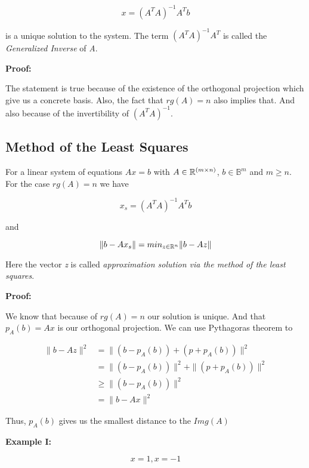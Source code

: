 \[
	x = {(A^T A)}^{-1} A^T b
\]

is a unique solution to the system. The term \({(A^T A)}^{-1}A^T\) is called the 
\emph{Generalized Inverse} of \emph{A}.
\vspace{\baselineskip}

\textbf{Proof:}

The statement is true because of the existence of the orthogonal projection which give us a concrete basis. Also, 
the fact that \(rg(A) = n\) also implies that. And also because of the invertibility of \({(A^T A)}^{-1}\).

\QED

\subsection{Method of the Least Squares}

For a linear system of equations \(Ax=b\) with \(A \in \mathbb{R}^{(m \times n)}\), 
\(b \in \mathbb{B}^m\) and \(m \ge n\). For the case \(rg(A) = n\) we have

\[
	x_s = {(A^T A)}^{-1} A^T b
\]

and 

\[
	\| b - Ax_s \| = min_{z \in \mathbb{R}^n} \| b - Az \| 
\]

Here the vector \emph{z} is called \emph{approximation solution via the method of the least squares}.
\vspace{\baselineskip}

\textbf{Proof:}

We know that because of \(rg(A) = n\) our solution is unique. And that \(p_A(b) = Ax\) is our orthogonal 
projection. We can use Pythagoras theorem to


\begin{align*}
	\| b - Az \|^2 &= \| (b  - p_A (b))  + (p + p_A(b)) \|^2 \\
				&=  \| (b  - p_A (b))\|^2  +\|(p + p_A(b)) \|^2 \\
				&\ge  \| (b  - p_A (b))\|^2 \\
				&= \| b - Ax \|^2 
\end{align*}

Thus, \(p_A(b)\) gives us the smallest distance to the \(Img(A)\)

\QED
\vspace{\baselineskip}

\textbf{Example I:}
\vspace{\baselineskip}

\[
	x = 1, x = -1
\]

